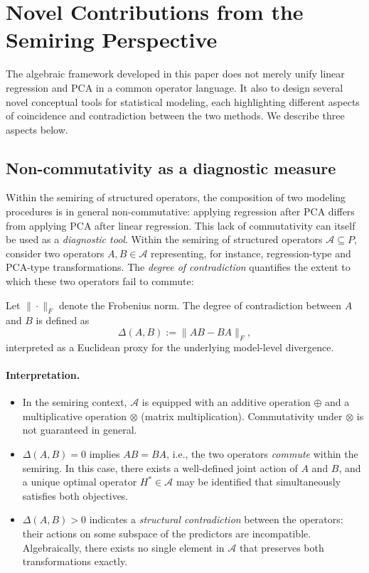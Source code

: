 \section{Novel Contributions from the Semiring Perspective}

The algebraic framework developed in this paper does not merely unify linear regression and PCA in a common operator language. It also to design several novel conceptual tools for statistical modeling, each highlighting different aspects of coincidence and contradiction between the two methods. 
We describe three aspects below.

\subsection{Non-commutativity as a diagnostic measure}

Within the semiring of structured operators, the composition of two modeling procedures is in general non-commutative: applying regression after PCA differs from applying PCA after linear regression. This lack of commutativity can itself be used as a \emph{diagnostic tool}. Within the semiring of structured operators $\mathcal{A} \subseteq P$, consider two operators $A, B \in \mathcal{A}$ representing, for instance, regression-type and PCA-type transformations. The \emph{degree of contradiction} quantifies the extent to which these two operators fail to commute:

\begin{defn}
Let $\|\cdot\|_F$ denote the Frobenius norm. The degree of contradiction between $A$ and $B$ is defined as
\[
\Delta(A,B) := \| AB - BA \|_F,
\]
interpreted as a Euclidean proxy for the underlying model-level divergence.
\end{defn}

\paragraph{Interpretation.}
\begin{itemize}
    \item In the semiring context, $\mathcal{A}$ is equipped with an additive operation $\oplus$ 
          and a multiplicative operation $\otimes$ (matrix multiplication). 
          Commutativity under $\otimes$ is not guaranteed in general. 
    \item $\Delta(A,B) = 0$ implies $AB = BA$, i.e., the two operators \emph{commute} within the semiring. 
          In this case, there exists a well-defined joint action of $A$ and $B$, and a unique optimal operator 
          $H^* \in \mathcal{A}$ may be identified that simultaneously satisfies both objectives.
    \item $\Delta(A,B) > 0$ indicates a \emph{structural contradiction} between the operators: 
          their actions on some subspace of the predictors are incompatible. 
          Algebraically, there exists no single element in $\mathcal{A}$ that preserves both transformations exactly.
\end{itemize}

